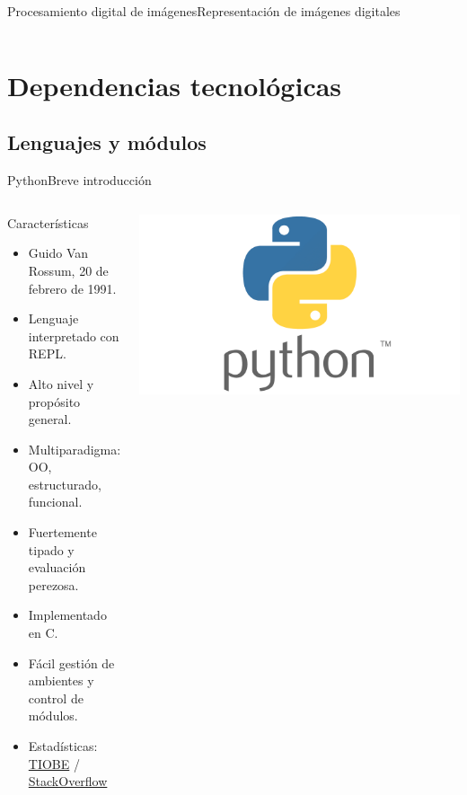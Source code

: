 \documentclass[aspectratio=169,10pt]{beamer}
\begin{document}
\begin{frame}{Procesamiento digital de imágenes}{Representación de imágenes digitales}
\begin{columns}
  \end{columns}
\end{frame}


\section{Dependencias tecnológicas}
\subsection{Lenguajes y módulos}

\begin{frame}{Python}{Breve introducción}
  \begin{columns}
    \begin{exampleblock}{Características}
      \begin{itemize}
        \item Guido Van Rossum, 20 de febrero de 1991.
        \item Lenguaje interpretado con REPL.
        \item Alto nivel y propósito general.
        \item Multiparadigma: OO, estructurado, funcional.
        \item Fuertemente tipado y evaluación perezosa.
        \item Implementado en C.
        \item Fácil gestión de ambientes y control de módulos.
        \item Estadísticas: \href{https://www.tiobe.com/tiobe-index/}{TIOBE} / \href{https://insights.stackoverflow.com/survey/2021}{StackOverflow}
      \end{itemize}
    \end{exampleblock}
    \includegraphics[width=\columnwidth]{python.png}
  \end{columns}
\end{frame}
\end{document}
